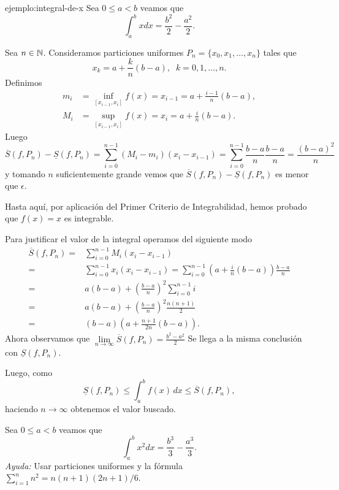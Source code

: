 \begin{ejemplo}{ejemplo:integral-de-x} Sea $0\leq a<b$ veamos que 
\[
 \int_a^b x dx=\frac{b^2}{2}-\frac{a^2}{2}.
\]
\begin{demo}
Sea $n \in \mathbb{N}$.
Consideramos particiones uniformes $P_n=\{x_0,x_1,\ldots,x_n\}$ tales que
\[x_k=a+\frac{k}{n}(b-a),\;\;  k=0,1,\ldots,n.\]
Definimos
\[\begin{split}
m_i&=\inf\limits_{[x_{i-1},x_i]}f(x)=x_{i-1}=a+\frac{i-1}{n}(b-a),
\\
M_i&=\sup\limits_{[x_{i-1},x_i]}f(x)=x_{i}=a+\frac{i}{n}(b-a).
\end{split}\]
Luego
\[
\overline{S}(f,P_n)-\underline{S}(f,P_n)=
\sum\limits_{i=0}^{n-1} (M_i-m_i)(x_i-x_{i-1})=
\sum\limits_{i=0}^{n-1}  
\frac{b-a}{n}\frac{b-a}{n}=\frac{(b-a)^2}{n}
\]
y tomando $n$ suficientemente grande vemos que $\overline{S}(f,P_n)-\underline{S}(f,P_n)$ es menor que $\epsilon$.

Hasta aqu\'i, por aplicaci\'on del Primer Criterio de Integrabilidad,  hemos probado que $f(x)=x$ es integrable. 

Para justificar el valor de la integral operamos del siguiente modo
\[
\begin{split}
\overline{S}(f,P_n)=&
\sum\limits_{i=0}^{n-1} M_i(x_i-x_{i-1})
\\
=&\sum\limits_{i=0}^{n-1} x_i(x_i-x_{i-1})=\sum\limits_{i=0}^{n-1}
\left(a+\frac{i}{n}(b-a) \right)\frac{b-a}{n}
\\
=&a(b-a)+\left(\frac{b-a}{n} \right)^2\sum\limits_{i=0}^{n-1} i
\\
=& a(b-a)+\left(\frac{b-a}{n} \right)^2 \frac{n(n+1)}{2}
\\
=&(b-a)\left(a+\frac{n+1}{2n} (b-a)\right).
\end{split}
\]
Ahora observamos que 
$\lim\limits_{n \to \infty} \overline{S}(f,P_n)=\frac{b^2-a^2}{2}$
Se llega a la misma conclusi\'on con $\underline{S}(f,P_n)$.

Luego, como 
\[
\underline{S}(f,P_n)\leq \int_a^b f(x)\,dx \leq \overline{S}(f,P_n),
\]
haciendo $n \to \infty$ obtenemos el valor buscado.
\end{demo}



\end{ejemplo}


\begin{ejercicio}{} Sea $0\leq a<b$ veamos que 
\[
 \int_a^b x^2 dx=\frac{b^3}{3}-\frac{a^3}{3}.
\]
{\em Ayuda:} Usar particiones uniformes y la fórmula $\sum_{i=1}^n n^2= n(n+1)(2n+1)/6$.
\end{ejercicio}

